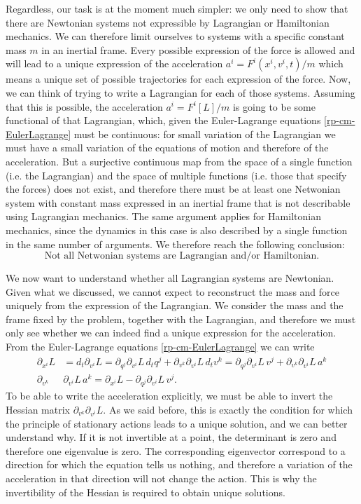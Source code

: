 Regardless, our task is at the moment much simpler: we only need to show that there are Newtonian systems not expressible by Lagrangian or Hamiltonian mechanics. We can therefore limit ourselves to systems with a specific constant mass $m$ in an inertial frame. Every possible expression of the force is allowed and will lead to a unique expression of the acceleration $a^i=F^i(x^i, v^i, t)/m$ which means a unique set of possible trajectories for each expression of the force. Now, we can think of trying to write a Lagrangian for each of those systems. Assuming that this is possible, the acceleration $a^i=F^i[L]/m$ is going to be some functional of that Lagrangian, which, given the Euler-Lagrange equations \ref{rp-cm-EulerLagrange} must be continuous: for small variation of the Lagrangian we must have a small variation of the equations of motion and therefore of the acceleration. But a surjective continuous map from the space of a single function (i.e. the Lagrangian) and the space of multiple functions (i.e. those that specify the forces) does not exist, and therefore there must be at least one Netwonian system with constant mass expressed in an inertial frame that is not describable using Lagrangian mechanics. The same argument applies for Hamiltonian mechanics, since the dynamics in this case is also described by a single function in the same number of arguments. We therefore reach the following conclusion:
\begin{equation}
	\textrm{Not all Netwonian systems are Lagrangian and/or Hamiltonian.}
\end{equation}

We now want to understand whether all Lagrangian systems are Newtonian. Given what we discussed, we cannot expect to reconstruct the mass and force uniquely from the expression of the Lagrangian. We consider the mass and the frame fixed by the problem, together with the Lagrangian, and therefore we must only see whether we can indeed find a unique expression for the acceleration. From the Euler-Lagrange equations \ref{rp-cm-EulerLagrange} we can write
\begin{equation}
	\begin{aligned}
	\partial_{x^i}L&=d_t \partial_{v^i} L=\partial_{q^j} \partial_{v^i} L \, d_t q^j + \partial_{v^k} \partial_{v^i} L \, d_t v^k = \partial_{q^j} \partial_{v^i} L \, v^j + \partial_{v^k} \partial_{v^i} L \, a^k \\
	\partial_{v^k} &\partial_{v^i} L \, a^k = \partial_{x^i}L - \partial_{q^j} \partial_{v^i} L \, v^j .
	\end{aligned}
\end{equation}
To be able to write the acceleration explicitly, we must be able to invert the Hessian matrix $\partial_{v^k} \partial_{v^i} L$. As we said before, this is exactly the condition for which the principle of stationary actions leads to a unique solution, and we can better understand why. If it is not invertible at a point, the determinant is zero and therefore one eigenvalue is zero. The corresponding eigenvector correspond to a direction for which the equation tells us nothing, and therefore a variation of the acceleration in that direction will not change the action. This is why the invertibility of the Hessian is required to obtain unique solutions.

